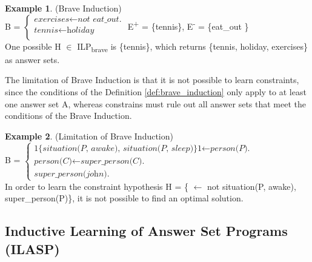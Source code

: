 \documentclass[11pt,twoside]{report}
\theoremstyle{plain}
\theoremstyle{definition}
\newtheorem{examp}{Example}[section]
\begin{document}
\begin{examp} \normalfont (Brave Induction) \\

B = $\begin{cases}
	\textit{exercises}  \leftarrow \textit{not \ eat\_out.} \\
	\textit{tennis} \leftarrow \textit{holiday} \\
      \end{cases}$
E\textsuperscript{+} = \{tennis\},   E\textsuperscript{-} = \{eat\_out \} \\

One possible  H $\in$ ILP\textsubscript{brave} is \{tennis\}, which returns \{tennis, holiday, exercises\} as answer sets.
\end{examp}
\label{brave_induction_example}

The limitation of Brave Induction is that it is not possible to learn constraints, since the conditions of the Definition \ref{def:brave_induction} only apply to at least one answer set A, 
whereas constrains must rule out all answer sets that meet  the conditions of the Brave Induction.

\begin{examp} \normalfont (Limitation of Brave Induction) \\

B = $\begin{cases}
	\textit{1\{situation(P, awake), situation(P, sleep)\}1} \leftarrow \textit{person(P).} \\
	\textit{person(C)} \leftarrow \textit{super\_person(C).} \\
	\textit{super\_person(john).}
	\end{cases}$ \\

In order to learn the  constraint hypothesis H = \{ $\leftarrow$ not situation(P, awake), super\_person(P)\}, it is not possible to find an optimal solution.
\end{examp}
\label{limitation_brave}

\subsection{Inductive Learning of Answer Set Programs (ILASP)}
\label{section_lasp}
\end{document}
